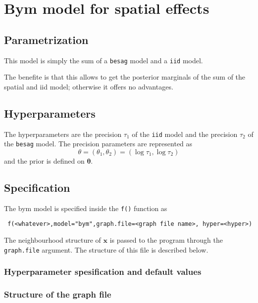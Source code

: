 \documentclass[a4paper,11pt]{article}
\begin{document}
\section*{Bym model for spatial effects}

\subsection*{Parametrization}

This model is simply the sum of a \lstinline$besag$ model and a
\lstinline$iid$ model.
 
The benefite is that this allows to get the posterior marginals of the
sum of the spatial and iid model; otherwise it offers no advantages.

\subsection*{Hyperparameters}
The hyperparameters are the precision $\tau_1$ of the \lstinline$iid$
model and the precision $\tau_2$ of the \lstinline$besag$ model.  The
precision parameters are represented as
\begin{displaymath}
    \theta=(\theta_1,\theta_2) =(\log \tau_1,\log \tau_2)
\end{displaymath}
and the prior is defined on $\mathbf{\theta}$.

\subsection*{Specification}

The bym model is specified inside the {\tt f()} function as
\begin{verbatim}
 f(<whatever>,model="bym",graph.file=<graph file name>, hyper=<hyper>)
\end{verbatim}

The neighbourhood structure of $\mathbf{x}$ is passed to the program
through the {\tt graph.file} argument.  The structure of this file is
described below.

\subsubsection*{Hyperparameter spesification and default values}



\subsubsection*{Structure of the graph file}
\end{document}
